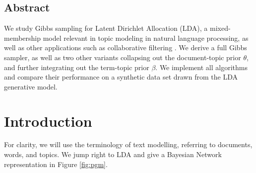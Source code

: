 \documentclass[a0,portrait]{a0poster}
\begin{document}

\begin{multicols}{2} %




\subsection*{Abstract}

\large{
We study Gibbs sampling for Latent Dirichlet Allocation (LDA), a mixed-membership model relevant in topic modeling in natural language processing, as well as other applications such as collaborative filtering \cite{blei2003lda}. We derive a full Gibbs sampler, as well as two other variants collapsing out the document-topic prior $\theta$, and further integrating out the term-topic prior $\beta$. We implement all algorithms and compare their performance on a synthetic data set drawn from the LDA generative model. 
}



\section*{Introduction}

\large{
For clarity, we will use the terminology of text modelling, referring to documents, words, and topics. We jump right to LDA and give a Bayesian Network representation in Figure \ref{fig:pgm}.

}



\end{multicols}
\end{document}
